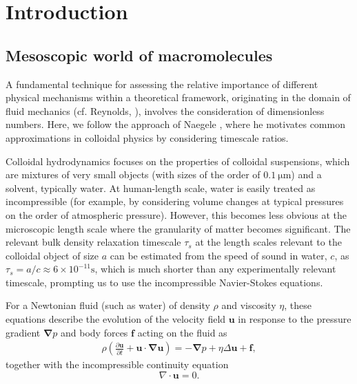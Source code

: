 \documentclass{doctoral}
\newcommand{\pd}{\partial}
\begin{document}
\chapter{Introduction}

\section{Mesoscopic world of macromolecules}

A fundamental technique for assessing the relative importance of different physical mechanisms within a theoretical framework, originating in the domain of fluid mechanics (cf.
Reynolds, \cite{Reynolds_1883}), involves the consideration of dimensionless numbers.
Here, we follow the approach of Naegele \cite{Nagele_2013}, where he motivates common approximations in colloidal physics by considering timescale ratios.

Colloidal hydrodynamics focuses on the properties of colloidal suspensions, which are mixtures of very small objects (with sizes of the order of $0.1\ \mathrm{\mu m}$) and a solvent, typically water.
At human-length scale, water is easily treated as incompressible (for example, by considering volume changes at typical pressures on the order of atmospheric pressure).
However, this becomes less obvious at the microscopic length scale where the granularity of matter becomes significant.
The relevant bulk density relaxation timescale $\tau_s$ at the length scales relevant to the colloidal object of size $a$ can be estimated from the speed of sound in water, $c$, as $\tau_s = a/c \approx 6 \times 10^{-11} \mathrm{s}$, which is much shorter than any experimentally relevant timescale, prompting us to use the incompressible Navier-Stokes equations.

For a Newtonian fluid (such as water) of density $\rho$ and viscosity $\eta$, these equations describe the evolution of the velocity field $\bm{u}$ in response to the pressure gradient $\bm{\nabla} p$ and body forces $\bm{f}$ acting on the fluid as
\begin{eqnarray}
    \rho \left( \frac{\pd \bm{u}}{\pd t} + \bm{u} \cdot \bm{\nabla u} \right) = - \bm{\nabla} p + \eta \Delta \bm{u} + \bm{f}, \label{eqn:navier-stokes-equation}
\end{eqnarray}
together with the incompressible continuity equation
\begin{equation}
    \nabla \cdot \bm{u} = 0 \label{eqn:incompressibility}.
\end{equation}
\end{document}
